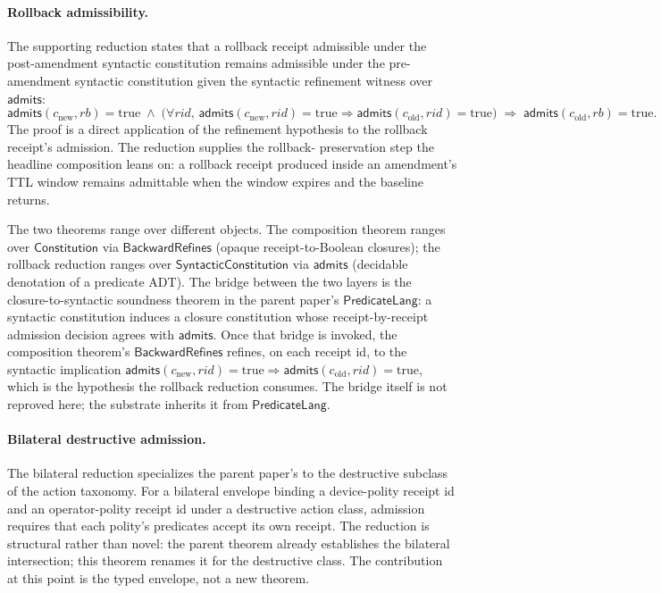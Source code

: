 \paragraph{Rollback admissibility.}
The supporting reduction 
states that a rollback receipt admissible under the post-amendment
syntactic constitution remains admissible under the pre-amendment
syntactic constitution given the syntactic refinement witness over
$\mathsf{admits}$:
\[
  \mathsf{admits}(c_{\text{new}}, \mathit{rb}) = \text{true}
    \;\wedge\; \bigl(\forall \mathit{rid},\,
       \mathsf{admits}(c_{\text{new}}, \mathit{rid}) = \text{true}
       \Rightarrow \mathsf{admits}(c_{\text{old}}, \mathit{rid}) = \text{true}\bigr)
    \;\Rightarrow\; \mathsf{admits}(c_{\text{old}}, \mathit{rb}) = \text{true}.
\]
The proof is a direct application of the refinement hypothesis to the
rollback receipt's admission. The reduction supplies the rollback-
preservation step the headline composition leans on: a rollback
receipt produced inside an amendment's TTL window remains admittable
when the window expires and the baseline returns.

The two theorems range over different objects. The composition theorem
ranges over $\mathsf{Constitution}$ via $\mathsf{BackwardRefines}$
(opaque receipt-to-Boolean closures); the rollback reduction ranges
over $\mathsf{SyntacticConstitution}$ via $\mathsf{admits}$ (decidable
denotation of a predicate ADT). The bridge between the two layers is
the closure-to-syntactic soundness theorem in the parent paper's
$\mathsf{PredicateLang}$: a syntactic constitution induces a closure
constitution whose receipt-by-receipt admission decision agrees with
$\mathsf{admits}$. Once that bridge is invoked, the composition
theorem's $\mathsf{BackwardRefines}$ refines, on each receipt id, to
the syntactic implication
$\mathsf{admits}(c_{\text{new}}, \mathit{rid}) = \text{true} \Rightarrow
 \mathsf{admits}(c_{\text{old}}, \mathit{rid}) = \text{true}$, which is
the hypothesis the rollback reduction consumes. The bridge itself is
not reproved here; the substrate inherits it from $\mathsf{PredicateLang}$.

\paragraph{Bilateral destructive admission.}
The bilateral reduction 
specializes the parent paper's
 to the destructive
subclass of the action taxonomy. For a bilateral envelope binding a
device-polity receipt id and an operator-polity receipt id under a
destructive action class, admission requires that each polity's
predicates accept its own receipt. The reduction is structural rather
than novel: the parent theorem already establishes the bilateral
intersection; this theorem renames it for the destructive class. The
contribution at this point is the typed envelope, not a new theorem.

